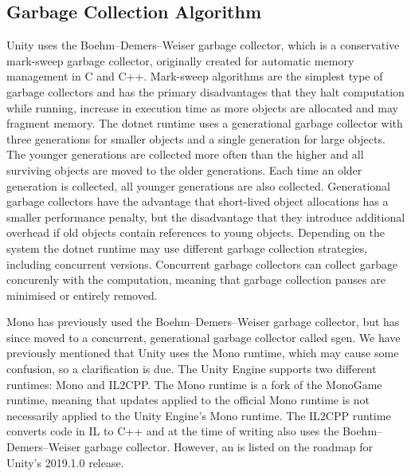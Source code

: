 \subsection{Garbage Collection Algorithm}
Unity uses the Boehm–Demers–Weiser garbage collector, which is a conservative mark-sweep garbage collector\cite{unity:heap}, originally created for automatic memory management in C and C++\cite{boehm2007transparent}. Mark-sweep algorithms are the simplest type of garbage collectors and has the primary disadvantages that they halt computation while running, increase in execution time as more objects are allocated and may fragment memory\cite{sestoft2017programming}. The dotnet runtime uses a generational garbage collector with three generations for smaller objects and a single generation for large objects\cite{dotnet:gc}. The younger generations are collected more often than the higher and all surviving objects are moved to the older generations. Each time an older generation is collected, all younger generations are also collected. Generational garbage collectors have the advantage that short-lived object allocations has a smaller performance penalty, but the disadvantage that they introduce additional overhead if old objects contain references to young objects\cite{sestoft2017programming}. Depending on the system the dotnet runtime may use different garbage collection strategies, including concurrent versions\cite{dotnet:gc}. Concurrent garbage collectors can collect garbage concurenly with the computation, meaning that garbage collection pauses are minimised or entirely removed\cite{dotnet:gc}.

Mono has previously used the Boehm–Demers–Weiser garbage collector, but has since moved to a concurrent, generational garbage collector called sgen\cite{mono:gc}. We have previously mentioned that Unity uses the Mono runtime, which may cause some confusion, so a clarification is due. The Unity Engine supports two different runtimes: Mono and IL2CPP. The Mono runtime is a fork of the MonoGame runtime, meaning that updates applied to the official Mono runtime is not necessarily applied to the Unity Engine's Mono runtime. The IL2CPP runtime converts code in \gls{IL} to C++ and at the time of writing also uses the Boehm–Demers–Weiser garbage collector\cite{il2cpp:gc}. However, an \textit{} is listed on the roadmap for Unity's 2019.1.0 release\cite{unity:roadmap}.

